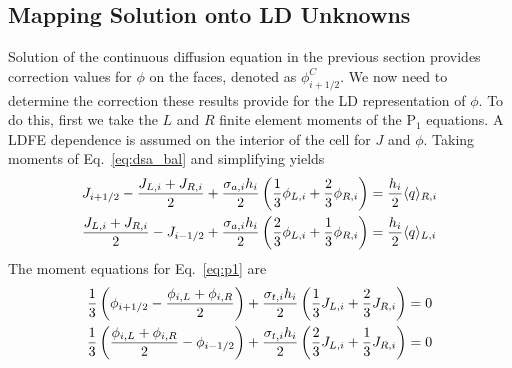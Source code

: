 \subsection{Mapping Solution onto LD Unknowns}

Solution of the continuous diffusion equation in the previous section provides
correction values for $\phi$ on the faces, denoted as $\phi_{i+1/2}^C$. We now need
to determine the correction these results provide for the LD representation of
$\phi$. To do this, first we take the $L$ and $R$ finite element moments of the P$_1$
equations.  A LDFE dependence is assumed on the interior of the cell for $J$ and
$\phi$.  Taking moments of Eq.~\eqref{eq:dsa_bal} and simplifying yields
\begin{align}
    J_{{i+1/2}} - \frac{J_{L,i} + J_{R,i}}{2} + \frac{\sigma_{a,i} h_i}{2} \left(\frac{1}{3} \phi_{L,i} +
    \frac{2}{3}\phi_{R,i}\right) &= \frac{h_i}{2} \langle q \rangle_{R,i} \\
    \frac{J_{L,i} + J_{R,i}}{2} - J_{i-1/2} + \frac{\sigma_{a,i} h_i}{2}
    \left(\frac{2}{3} \phi_{L,i} +
    \frac{1}{3}\phi_{R,i}\right) &= \frac{h_i}{2} \langle q \rangle_{L,i}
\end{align}
The moment equations for Eq.~\eqref{eq:p1} are
\begin{align}
    \frac{1}{3}\left(\phi_{{i+1/2}} - \frac{\phi_{i,L} + \phi_{i,R}}{2}\right) +
    \frac{\sigma_{t,i} h_i}{2} \left(\frac{1}{3} J_{L,i} + \frac{2}{3}J_{R,i}\right)
    &= 0 \\
    \frac{1}{3}\left(\frac{\phi_{i,L} + \phi_{i,R}}{2} - \phi_{i-1/2} \right) +
    \frac{\sigma_{t,i} h_i}{2} \left(\frac{2}{3} J_{L,i} + \frac{1}{3}J_{R,i}\right)
    &= 0 
\end{align}

